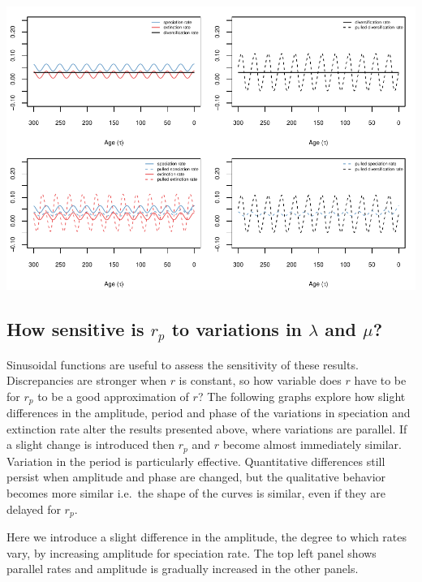 \documentclass[
]{article}
\begin{document}
\includegraphics{supplement_files/figure-latex/unnamed-chunk-19-1.pdf}

\pagebreak

\hypertarget{how-sensitive-is-r_p-to-variations-in-lambda-and-mu}{%
\subsection{\texorpdfstring{How sensitive is \(r_p\) to variations in
\(\lambda\) and
\(\mu\)?}{How sensitive is r\_p to variations in \textbackslash lambda and \textbackslash mu?}}\label{how-sensitive-is-r_p-to-variations-in-lambda-and-mu}}

Sinusoidal functions are useful to assess the sensitivity of these
results. Discrepancies are stronger when \(r\) is constant, so how
variable does \(r\) have to be for \(r_p\) to be a good approximation of
\(r\)? The following graphs explore how slight differences in the
amplitude, period and phase of the variations in speciation and
extinction rate alter the results presented above, where variations are
parallel. If a slight change is introduced then \(r_p\) and \(r\) become
almost immediately similar. Variation in the period is particularly
effective. Quantitative differences still persist when amplitude and
phase are changed, but the qualitative behavior becomes more similar
i.e.~the shape of the curves is similar, even if they are delayed for
\(r_p\).

\pagebreak

Here we introduce a slight difference in the amplitude, the degree to
which rates vary, by increasing amplitude for speciation rate. The top
left panel shows parallel rates and amplitude is gradually increased in
the other panels.
\end{document}
